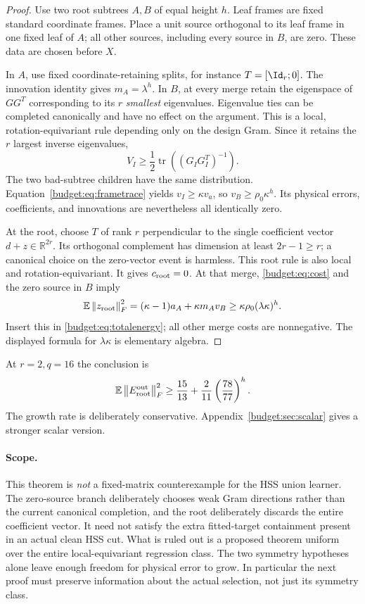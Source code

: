 \documentclass[11pt,oneside,openany,a4paper]{book}
\numberwithin{equation}{chapter}
\theoremstyle{definition}
\theoremstyle{remark}
\newcommand{\R}{\mathbb R}\newcommand{\E}{\mathbb E}\newcommand{\Prb}{\mathbb P}\newcommand{\PP}{\mathbb P}
\newcommand{\F}[1]{\left\lVert#1\right\rVert_F}
\DeclareMathOperator{\tr}{tr}\DeclareMathOperator{\rank}{rank}
\begin{document}
\begin{proof}
Use two root subtrees $A,B$ of equal height $h$. Leaf frames are fixed standard coordinate frames. Place a unit source orthogonal to its leaf frame in one fixed leaf of $A$; all other sources, including every source in $B$, are zero. These data are chosen before $X$.

In $A$, use fixed coordinate-retaining splits, for instance $T=[\Id_r;0]$. The innovation identity gives $m_A=\lambda^h$. In $B$, at every merge retain the eigenspace of $GG^T$ corresponding to its $r$ \emph{smallest} eigenvalues. Eigenvalue ties can be completed canonically and have no effect on the argument. This is a local, rotation-equivariant rule depending only on the design Gram. Since it retains the $r$ largest inverse eigenvalues,
\[
 V_I\ge\frac12\tr((G_IG_I^T)^{-1}).
\]
The two bad-subtree children have the same distribution. Equation~\eqref{budget:eq:frametrace} yields $v_I\ge\kappa v_a$, so $v_B\ge\rho_0\kappa^h$. Its physical errors, coefficients, and innovations are nevertheless all identically zero.

At the root, choose $T$ of rank $r$ perpendicular to the single coefficient vector $d+z\in\R^{2r}$. Its orthogonal complement has dimension at least $2r-1\ge r$; a canonical choice on the zero-vector event is harmless. This root rule is also local and rotation-equivariant. It gives $c_{\rm root}=0$. At that merge, \eqref{budget:eq:cost} and the zero source in $B$ imply
\[
 \E\F{z_{\rm root}}^2=(\kappa-1)a_A+\kappa m_Av_B
 \ge\kappa\rho_0(\lambda\kappa)^h.
\]
Insert this in \eqref{budget:eq:totalenergy}; all other merge costs are nonnegative. The displayed formula for $\lambda\kappa$ is elementary algebra.
\end{proof}

At $r=2,q=16$ the conclusion is
\begin{equation}\label{budget:eq:counter16}
 \E\F{E_{\rm root}^{\rm out}}^2
 \ge\frac{15}{13}+\frac2{11}\left(\frac{78}{77}\right)^h.
\end{equation}
The growth rate is deliberately conservative. Appendix~\ref{budget:sec:scalar} gives a stronger scalar version.

\paragraph{Scope.}
This theorem is \emph{not} a fixed-matrix counterexample for the HSS union learner. The zero-source branch deliberately chooses weak Gram directions rather than the current canonical completion, and the root deliberately discards the entire coefficient vector. It need not satisfy the extra fitted-target containment present in an actual clean HSS cut. What is ruled out is a proposed theorem uniform over the entire local-equivariant regression class. The two symmetry hypotheses alone leave enough freedom for physical error to grow. In particular the next proof must preserve information about the actual selection, not just its symmetry class.
\end{document}
